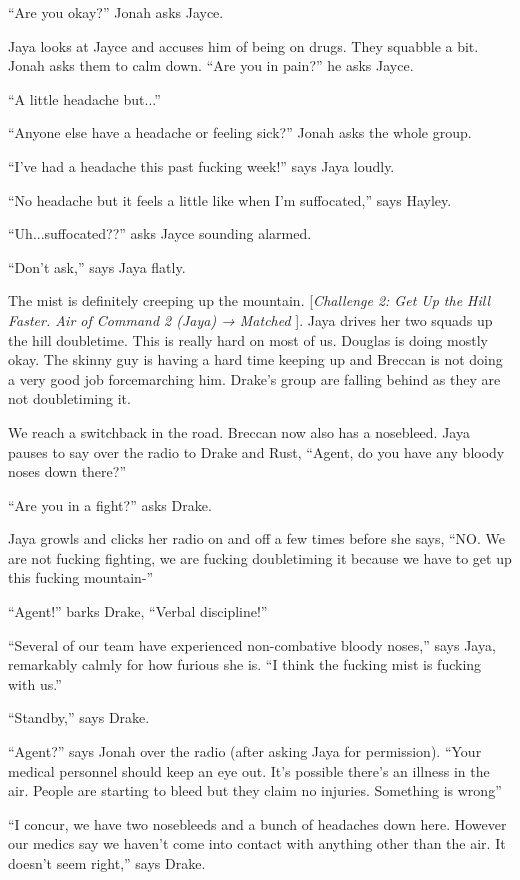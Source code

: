 ``Are you okay?'' Jonah asks Jayce.

Jaya looks at Jayce and accuses him of being on drugs.  They squabble a bit.  Jonah asks them to calm down.  ``Are you in pain?'' he asks Jayce.

``A little headache but...''

``Anyone else have a headache or feeling sick?'' Jonah asks the whole group.

``I've had a headache this past fucking week!'' says Jaya loudly.

``No headache but it feels a little like when I'm suffocated,'' says Hayley.

``Uh...suffocated??'' asks Jayce sounding alarmed.

``Don't ask,'' says Jaya flatly.

The mist is definitely creeping up the mountain.  {[}\textit{Challenge 2: Get Up the Hill Faster.  Air of Command 2 (Jaya) → Matched }{]}. Jaya drives her two squads up the hill doubletime.  This is really hard on most of us.  Douglas is doing mostly okay.  The skinny guy is having a hard time keeping up and Breccan is not doing a very good job forcemarching him.  Drake's group are falling behind as they are not doubletiming it.



We reach a switchback in the road.  Breccan now also has a nosebleed.  Jaya pauses to say over the radio to Drake and Rust, ``Agent, do you have any bloody noses down there?''

``Are you in a fight?'' asks Drake.

Jaya growls and clicks her radio on and off a few times before she says, ``NO.  We are not fucking fighting, we are fucking doubletiming it because we have to get up this fucking mountain-''

``Agent!'' barks Drake, ``Verbal discipline!''

``Several of our team have experienced non-combative bloody noses,'' says Jaya, remarkably calmly for how furious she is.  ``I think the fucking mist is fucking with us.''

``Standby,'' says Drake.

``Agent?'' says Jonah over the radio (after asking Jaya for permission).  ``Your medical personnel should keep an eye out.  It's possible there's an illness in the air.  People are starting to bleed but they claim no injuries.  Something is wrong''

``I concur, we have two nosebleeds and a bunch of headaches down here.  However our medics say we haven't come into contact with anything other than the air.  It doesn't seem right,'' says Drake.

